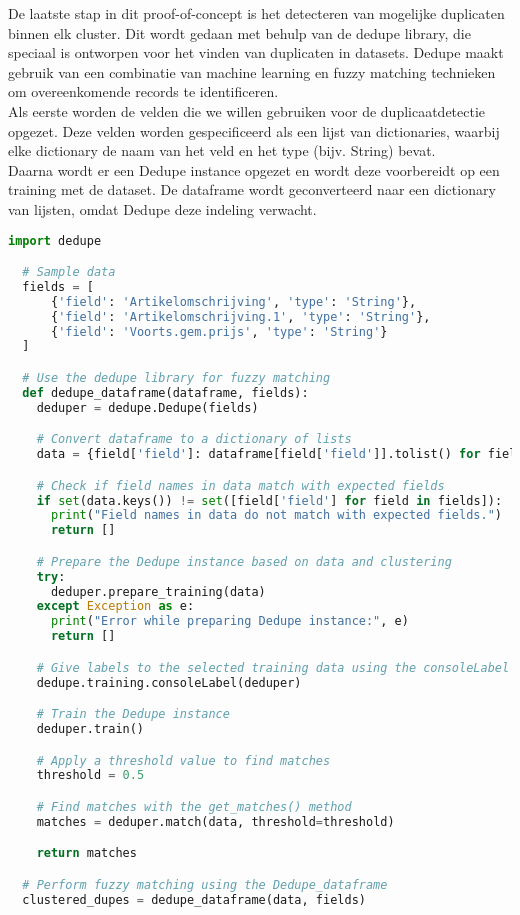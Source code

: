 De laatste stap in dit proof-of-concept is het detecteren van mogelijke duplicaten binnen elk cluster. Dit wordt gedaan met behulp van de dedupe library, die speciaal is ontworpen voor het vinden van duplicaten in datasets. Dedupe maakt gebruik van een combinatie van machine learning en fuzzy matching technieken om overeenkomende records te identificeren.
\\Als eerste worden de velden die we willen gebruiken voor de duplicaatdetectie opgezet. Deze velden worden gespecificeerd als een lijst van dictionaries, waarbij elke dictionary de naam van het veld en het type (bijv. String) bevat.
\\Daarna wordt er een Dedupe instance opgezet en wordt deze voorbereidt op een training met de dataset. De dataframe wordt geconverteerd naar een dictionary van lijsten, omdat Dedupe deze indeling verwacht.
\begin{lstlisting}[language=Python, caption={Opzetten van een Dedupe instance en trainen van deze instance met de data}]
  import dedupe

  # Sample data
  fields = [
      {'field': 'Artikelomschrijving', 'type': 'String'},
      {'field': 'Artikelomschrijving.1', 'type': 'String'},
      {'field': 'Voorts.gem.prijs', 'type': 'String'}
  ]

  # Use the dedupe library for fuzzy matching
  def dedupe_dataframe(dataframe, fields):
    deduper = dedupe.Dedupe(fields)

    # Convert dataframe to a dictionary of lists
    data = {field['field']: dataframe[field['field']].tolist() for field in fields}

    # Check if field names in data match with expected fields
    if set(data.keys()) != set([field['field'] for field in fields]):
      print("Field names in data do not match with expected fields.")
      return []

    # Prepare the Dedupe instance based on data and clustering
    try:
      deduper.prepare_training(data)
    except Exception as e:
      print("Error while preparing Dedupe instance:", e)
      return []

    # Give labels to the selected training data using the consoleLabel method
    dedupe.training.consoleLabel(deduper)

    # Train the Dedupe instance
    deduper.train()

    # Apply a threshold value to find matches
    threshold = 0.5

    # Find matches with the get_matches() method
    matches = deduper.match(data, threshold=threshold)

    return matches

  # Perform fuzzy matching using the Dedupe_dataframe
  clustered_dupes = dedupe_dataframe(data, fields)
\end{lstlisting}

